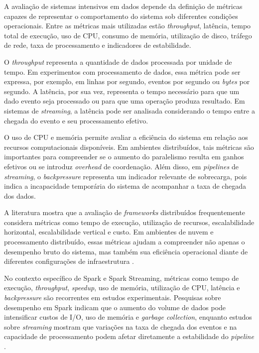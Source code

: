 A avaliação de sistemas intensivos em dados depende da definição de métricas capazes de representar o comportamento do sistema sob diferentes condições operacionais. Entre as métricas mais utilizadas estão \textit{throughput}, latência, tempo total de execução, uso de CPU, consumo de memória, utilização de disco, tráfego de rede, taxa de processamento e indicadores de estabilidade.

O \textit{throughput} representa a quantidade de dados processada por unidade de tempo. Em experimentos com processamento de dados, essa métrica pode ser expressa, por exemplo, em linhas por segundo, eventos por segundo ou \textit{bytes} por segundo. A latência, por sua vez, representa o tempo necessário para que um dado evento seja processado ou para que uma operação produza resultado. Em sistemas de \textit{streaming}, a latência pode ser analisada considerando o tempo entre a chegada do evento e seu processamento efetivo.

O uso de CPU e memória permite avaliar a eficiência do sistema em relação aos recursos computacionais disponíveis. Em ambientes distribuídos, tais métricas são importantes para compreender se o aumento do paralelismo resulta em ganhos efetivos ou se introduz \textit{overhead} de coordenação. Além disso, em \textit{pipelines} de \textit{streaming}, o \textit{backpressure} representa um indicador relevante de sobrecarga, pois indica a incapacidade temporária do sistema de acompanhar a taxa de chegada dos dados.

A literatura mostra que a avaliação de \textit{frameworks} distribuídos frequentemente considera métricas como tempo de execução, utilização de recursos, escalabilidade horizontal, escalabilidade vertical e custo. Em ambientes de nuvem e processamento distribuído, essas métricas ajudam a compreender não apenas o desempenho bruto do sistema, mas também sua eficiência operacional diante de diferentes configurações de infraestrutura \cite{ullah2022evaluation}.

No contexto específico de Spark e Spark Streaming, métricas como tempo de execução, \textit{throughput}, \textit{speedup}, uso de memória, utilização de CPU, latência e \textit{backpressure} são recorrentes em estudos experimentais. Pesquisas sobre desempenho em Spark indicam que o aumento do volume de dados pode intensificar custos de I/O, uso de memória e \textit{garbage collection}, enquanto estudos sobre \textit{streaming} mostram que variações na taxa de chegada dos eventos e na capacidade de processamento podem afetar diretamente a estabilidade do \textit{pipeline} \cite{awan2015data,ahmed2020comprehensive,matteussi2022performance}.

